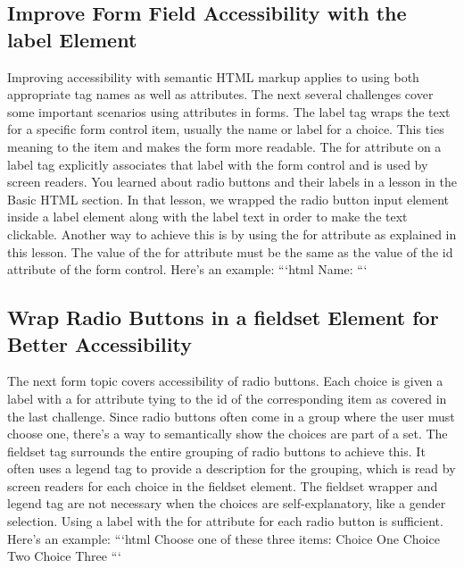\documentclass{article}%
\begin{document}
%
\subsection{Improve Form Field Accessibility with the label Element}%
\label{subsec:ImproveFormFieldAccessibilitywiththelabelElement}%
Improving accessibility with semantic HTML markup applies to using both appropriate tag names as well as attributes. The next several challenges cover some important scenarios using attributes in forms.\newline%
The label tag wraps the text for a specific form control item, usually the name or label for a choice. This ties meaning to the item and makes the form more readable. The for attribute on a label tag explicitly associates that label with the form control and is used by screen readers.\newline%
You learned about radio buttons and their labels in a lesson in the Basic HTML section. In that lesson, we wrapped the radio button input element inside a label element along with the label text in order to make the text clickable. Another way to achieve this is by using the for attribute as explained in this lesson.\newline%
The value of the for attribute must be the same as the value of the id attribute of the form control. Here's an example:\newline%
```html\newline%
Name:\newline%
```\newline%

%
\subsection{Wrap Radio Buttons in a fieldset Element for Better Accessibility}%
\label{subsec:WrapRadioButtonsinafieldsetElementforBetterAccessibility}%
The next form topic covers accessibility of radio buttons. Each choice is given a label with a for attribute tying to the id of the corresponding item as covered in the last challenge. Since radio buttons often come in a group where the user must choose one, there's a way to semantically show the choices are part of a set.\newline%
The fieldset tag surrounds the entire grouping of radio buttons to achieve this. It often uses a legend tag to provide a description for the grouping, which is read by screen readers for each choice in the fieldset element.\newline%
The fieldset wrapper and legend tag are not necessary when the choices are self{-}explanatory, like a gender selection. Using a label with the for attribute for each radio button is sufficient.\newline%
Here's an example:\newline%
```html\newline%
Choose one of these three items:\newline%
Choice One\newline%
Choice Two\newline%
Choice Three\newline%
```\newline%
\end{document}
